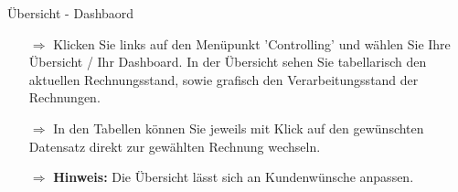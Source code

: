\documentclass{article}
\begin{document}


\pagebreak
{}

\vspace{\baselineskip}

\begin{beamerlikethm}{Übersicht - Dashbaord}
\begin{itemize}
  \item[$\Longrightarrow$] Klicken Sie links auf den Menüpunkt 'Controlling' und wählen Sie Ihre Übersicht / Ihr Dashboard. In der Übersicht sehen Sie tabellarisch den aktuellen Rechnungsstand, sowie grafisch den Verarbeitungsstand der Rechnungen.
 \item[$\Longrightarrow$] In den Tabellen können Sie jeweils mit Klick auf den gewünschten Datensatz direkt zur gewählten Rechnung wechseln.
 \item[$\Longrightarrow$] \textbf{Hinweis:} Die Übersicht lässt sich an Kundenwünsche anpassen.
\end{itemize}
\end{beamerlikethm}

\begin{centering}
\end{centering}

\end{document}
